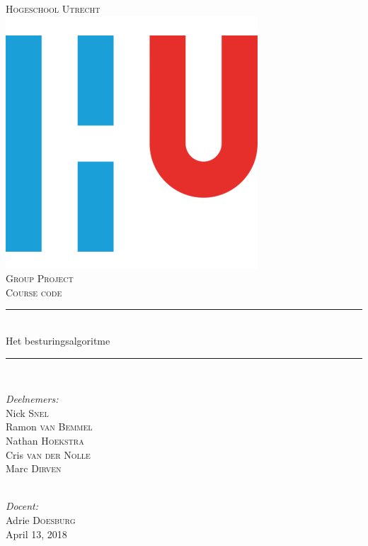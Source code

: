 \documentclass[12pt]{article}
\begin{document}
	\begin{titlepage}
		\newcommand{\HRule}{\rule{\linewidth}{0.5mm}} 
		\center
		\textsc{\LARGE Hogeschool Utrecht}\\[1.5cm]
		\includegraphics[scale=.25]{hu-logo}\\ [1cm] %
		\textsc{\Large Group Project}\\[0.5cm] %
		\textsc{\large Course code}\\[0.5cm] %
		\HRule \\[0.4cm]
		{ \huge Het besturingsalgoritme} \\[0.2cm] %
		\HRule \\[1.5cm]
		\begin{minipage}{0.4\textwidth}
			\begin{flushleft} \large
				\center
				\large \emph{Deelnemers:}\\
				Nick \textsc{Snel}\\
				Ramon \textsc{van Bemmel}\\
				Nathan \textsc{Hoekstra}\\
				Cris \textsc{van der Nolle}\\
				Marc \textsc{Dirven}
			\end{flushleft}
		\end{minipage}\\[1cm]
		\Large \emph{Docent:}\\
		Adrie \textsc{Doesburg}\\[.5cm]
		April 13, 2018
	\end{titlepage}
\newpage
	\renewcommand{\contentsname}{Inhoudsopgave} %
	\tableofcontents
	
\end{document}
